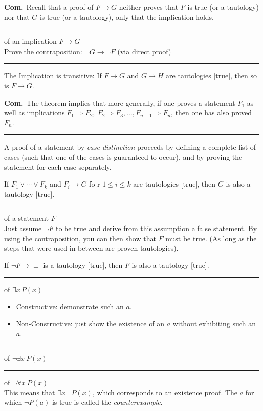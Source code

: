 \documentclass[a4paper]{extarticle}
\newcommand{\Com}{\textbf{Com.}\ }
\newcommand{\sep}{\vspace{5pt}\noindent\hrule\vspace{5pt}}
\begin{document}
\begin{multicols*}{2}
\Com Recall that a proof of $F\to G$ neither proves that $F$ is true (or a
tautology) nor that $G$ is true (or a tautology), only that the implication holds.

\sep
 
 of an implication $F\to G$
\\
Prove the contraposition: $\lnot G \to \lnot F$ (via direct proof)

\sep
 
 The Implication is transitive: If $F\to
G$ and $G\to H$ are tautologies [true], then so is $F\to G$.

\Com The theorem implies that more generally, if one proves a statement $F_1$ as
well as implications $F_1\Longrightarrow F_2, \ F_2 \Longrightarrow
F_3,\ldots,F_{n-1}\Longrightarrow F_n$, then one has also proved $F_n$.

\sep

 A proof of a statement by \emph{case distinction}
proceeds by defining a complete list of cases (such that one of the cases is
guaranteed to occur), and by proving the statement for each case separately.

\Thm If $F_1\lor\cdots\lor F_k$ and $F_i\to G$ fo
r $1\leq i \leq k$ are
tautologies [true], then $G$ is also a tautology [true].

\sep

 of a statement $F$
\\
Just assume $\lnot F$ to be true and derive from this assumption a false
statement. By using the contraposition, you can then show that $F$ must be true.
(As long as the steps that were used in between are proven tautologies).

\Thm If $\lnot F \to \perp $ is a tautology [true], then $F$ is also a
tautology [true].

\sep

 of $\exists x \ P(x)$
\begin{itemize}
  \item Constructive: demonstrate such an $a$.
  \item Non-Constructive: just show the existence of an $a$ without exhibiting
  such an $a$.
\end{itemize}

\sep

 of $\lnot\exists x\ P(x)$

\sep

 of $\lnot \forall x \ P(x)$\\
This means that $\exists x \ \lnot P(x)$, which corresponds to an existence
proof. The $a$ for which $\lnot P(a)$ is true is called the
\emph{counterexample}.


\end{multicols*}
\end{document}

